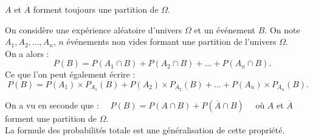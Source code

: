 \documentclass[a4paper,11pt,cours]{nsi} %
\begin{document}
\begin{remarque}[ ]
	$A$ et $\overline{A}$ forment toujours une partition de $\Omega$.
\end{remarque}

\begin{propriete}
	On considère une expérience aléatoire d'univers $\Omega$ et un événement $B$. On note $A_1,A_2,...,A_n$, $n$ événements non vides formant une partition de l'univers $\Omega$.\\
	On a alors : 
	$$\quad P(B)=P(A_1\cap B)+P(A_2\cap B)+...+P(A_n\cap B).$$
	Ce que l'on peut également écrire :
	$$P(B)=P(A_1)\times P_{A_1}(B)+P(A_2)\times P_{A_2}(B)+...+P(A_n)\times P_{A_n}(B).$$
\end{propriete}



\begin{demonstration}
		
\end{demonstration}

\begin{remarque}[ ]
	On a vu en seconde que : $\quad P(B)=P(A\cap B)+P(\overline{A} \cap B)\quad$ où $A$ et $\overline{A}$ forment une partition de $\Omega$.\\
	La formule des probabilités totale est une généralisation de cette propriété.
\end{remarque}
\end{document}
